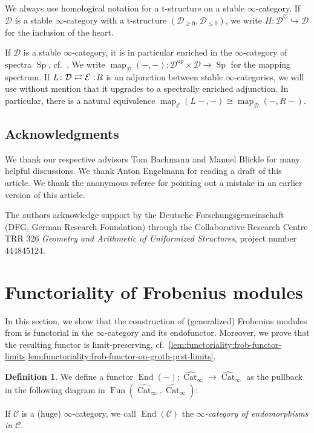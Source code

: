 \documentclass{article}
\theoremstyle{definition}
\newtheorem{defn}{Definition}[section]
\theoremstyle{definition}
\theoremstyle{definition}
\theoremstyle{plain}
\theoremstyle{plain}
\theoremstyle{plain}
\theoremstyle{plain}
\theoremstyle{plain}
\theoremstyle{plain}
\theoremstyle{plain}
\theoremstyle{plain}
\theoremstyle{remark}
\theoremstyle{remark}
\theoremstyle{plain}
\theoremstyle{plain}
\theoremstyle{plain}
\theoremstyle{plain}
\theoremstyle{plain}
\newcommand{\op}[1]{#1^{\operatorname{op}}}
\newcommand{\id}[1]{\operatorname{id}_{#1}}
\newcommand{\cartsymb}{\arrow[dr, phantom,"\scalebox{1.5}{\color{black}$\lrcorner$}", near start, color=black]}
\newcommand{\End}[1]{\operatorname{End}(#1)}
\newcommand{\Sp}{\operatorname{Sp}}
\newcommand{\Cat}[1]{\mathcal{#1}}
\newcommand{\map}[3]{\operatorname{map}_{#1}({#2}, {#3})} %
\newcommand{\Fun}[2]{\operatorname{Fun}({#1},{#2})}
\newcommand{\CatInfHuge}{\widehat{\operatorname{Cat}}_{\infty}}
\newcommand\noloc{%
  \nobreak
  \mspace{6mu plus 1mu}
  {:}
  \nonscript\mkern-\thinmuskip
  \mathpunct{}
  \mspace{2mu}
}
\begin{document}
We always use homological notation for a t-structure on a stable $\infty$-category.
If $\Cat D$ is a stable $\infty$-category with a t-structure $(\Cat D_{\ge 0}, \Cat D_{\le 0})$,
we write $H \colon \Cat D^\heartsuit \hookrightarrow \Cat D$ 
for the inclusion of the heart.

If $\Cat D$ is a stable $\infty$-category, it is in particular 
enriched in the $\infty$-category of spectra $\Sp$, cf.\ \cite[Example 7.4.14]{gepnerhaugseng}.
We write $\map{\Cat D}{-}{-} \colon \op{\Cat D} \times \Cat D \to \Sp$
for the mapping spectrum. If $L \colon \Cat D \rightleftarrows \Cat E \noloc R$
is an adjunction between stable $\infty$-categories,
we will use without mention that it upgrades to a spectrally enriched adjunction.
In particular, there is a natural equivalence $\map{\Cat E}{L-}{-} \cong \map{\Cat D}{-}{R-}$.

\subsection*{Acknowledgments}
We thank our respective advisors Tom Bachmann and Manuel Blickle for many helpful discussions. We 
thank Anton Engelmann for reading a draft of this article. We thank the anonymous referee for pointing out a mistake 
in an earlier version of this article.

The authors acknowledge support by the Deutsche Forschungsgemeinschaft 
(DFG, German Research Foundation) through the Collaborative Research 
Centre TRR 326 \textit{Geometry and Arithmetic of Uniformized 
Structures}, project number 444845124.

\section{Functoriality of Frobenius modules}

In this section, we show that the construction of (generalized) Frobenius modules from \cite[Definition 2.4]{cartmod} is functorial
in the $\infty$-category and its endofunctor. 
Moreover, we prove that the resulting functor is limit-preserving, cf.\ \cref{lem:functoriality:frob-functor-limits,lem:functoriality:frob-functor-on-groth-prst-limits}.

\begin{defn}
    We define a functor $\End{-} \colon \CatInfHuge \to \CatInfHuge$
    as the pullback in the following diagram in $\Fun{\CatInfHuge}{\CatInfHuge}$:
    \begin{center}
    \end{center}
    If $\Cat C$ is a (huge) $\infty$-category,
    we call $\End{\Cat C}$ the \emph{$\infty$-category of endomorphisms in $\Cat C$}.
\end{defn}
\end{document}
